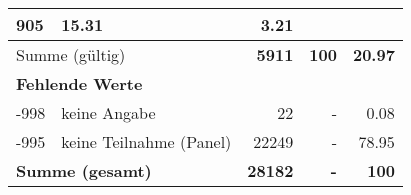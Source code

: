 \begin{longtable}{lXrrr}
       \num{905} &
       \num[round-mode=places,round-precision=2]{15,31} &
         \num[round-mode=places,round-precision=2]{3,21} \\
     \midrule
     \multicolumn{2}{l}{Summe (gültig)} &
       \textbf{\num{5911}} &
     \textbf{100} &
       \textbf{\num[round-mode=places,round-precision=2]{20,97}} \\
     \multicolumn{5}{l}{\textbf{Fehlende Werte}}\\
       -998 &
       keine Angabe &
         \num{22} &
        - &
         \num[round-mode=places,round-precision=2]{0,08} \\
       -995 &
       keine Teilnahme (Panel) &
         \num{22249} &
        - &
         \num[round-mode=places,round-precision=2]{78,95} \\
     \midrule
     \multicolumn{2}{l}{\textbf{Summe (gesamt)}} &
          \textbf{\num{28182}} &
        \textbf{-} &
        \textbf{100} \\
     \bottomrule
     \end{longtable}
     
